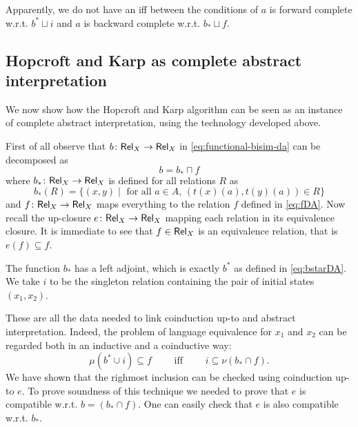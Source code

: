 \documentclass{llncs}
\begin{document}
\begin{remark}
Apparently, we do not have an iff between the conditions of $a$ is forward complete w.r.t. $b^*\sqcup i $ and $a$ is backward complete w.r.t. $b_* \sqcup f$.
\end{remark}





\subsection{Hopcroft and Karp as complete abstract interpretation}
We now show how the Hopcroft and Karp algorithm can be seen as an instance of complete abstract interpretation, using the technology developed above.

First of all observe that $b\colon \mathsf{Rel}_X\to \mathsf{Rel}_X$ in \eqref{eq:functional-bisim-da} can be decomposed as
$$b = b_* \sqcap f$$
where $b_* \colon \mathsf{Rel}_X\to  \mathsf{Rel}_X$ is defined for all relations $R$ as
\begin{equation}
b_*(R) =\{(x,y) \mid \text{ for all } a\in A, \, (t(x)(a), t(y)(a))\in R  \}
\end{equation}
and $f\colon \mathsf{Rel}_X \to \mathsf{Rel}_X$ maps everything to the relation $f$ defined in \eqref{eq:fDA}.
Now recall the up-closure $e\colon \mathsf{Rel}_X \to \mathsf{Rel}_X$ mapping each relation in its equivalence closure. It is immediate to see that $f\in \mathsf{Rel}_X$ is an equivalence relation, that is $e(f)\subseteq f$.

The function $b_*$ has a left adjoint, which is exactly $b^*$ as defined in \eqref{eq:bstarDA}. We take $i$ to be the singleton relation containing the pair of initial states $(x_1,x_2)$.

These are all the data needed to link coinduction up-to and abstract interpretation.
Indeed, the problem of language equivalence for $x_1$ and $x_2$ can be regarded both in an inductive and a coinductive way:
$$ \mu (b^*\cup i ) \subseteq  f \qquad  \text{ iff }\qquad i \subseteq \nu (b_*\cap f)\text{.}$$ 
We have shown that the righmost inclusion can be checked using coinduction up-to $e$. To prove soundness of this technique we needed to prove that $e$ is compatible w.r.t. $b=(b_*\cap f)$. One can easily check that $e$ is also compatible w.r.t. $b_*$.
\end{document}
